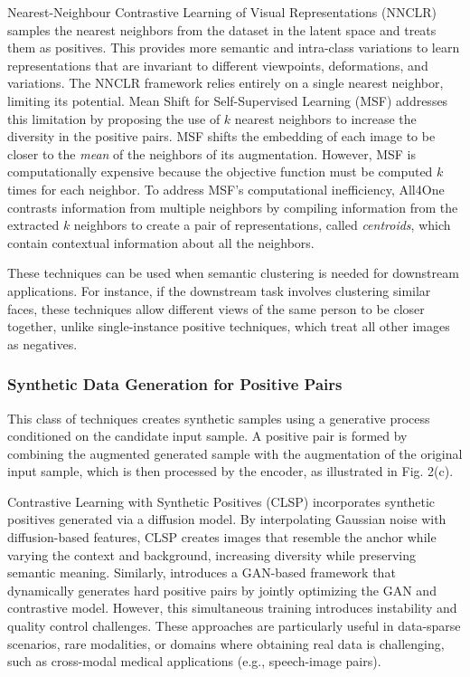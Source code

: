 Nearest-Neighbour Contrastive Learning of Visual Representations (NNCLR)\cite{dwibedi2021little} samples the nearest neighbors from the dataset in the latent space and treats them as positives. This provides
more semantic and intra-class variations to learn representations that are invariant to different viewpoints, deformations, and variations. The NNCLR framework relies entirely on a single nearest neighbor, limiting its potential. Mean Shift for Self-Supervised Learning (MSF) \cite{koohpayegani2021mean} addresses this limitation by proposing the use of \(k\) nearest neighbors to increase the diversity in the positive pairs. MSF shifts the embedding of each image to be closer to the \textit{mean} of the neighbors of its augmentation.
However, MSF is computationally expensive because the objective function must be computed \(k\) times for each neighbor. To address MSF's computational inefficiency, All4One \cite{estepa2023all4one} contrasts information from multiple neighbors by compiling information from the extracted \(k\) neighbors to create a pair of representations, called \textit{centroids}, which contain contextual information about all the neighbors. 

These techniques can be used when semantic clustering is needed for downstream applications. For instance, if the downstream task involves clustering similar faces, these techniques allow different views of the same person to be closer together, unlike single-instance positive techniques, which treat all other images as negatives.

\subsubsection{Synthetic Data Generation for Positive Pairs}

This class of techniques creates synthetic samples using a generative process conditioned on the candidate input sample. A positive pair is formed by combining the augmented generated sample with the augmentation of the original input sample, which is then processed by the encoder, as illustrated in Fig. 2(c).

Contrastive Learning with Synthetic Positives (CLSP) \cite{zeng2024contrastive} incorporates synthetic positives generated via a diffusion model. By interpolating Gaussian noise with diffusion-based features, CLSP creates images that resemble the anchor while varying the context and background, increasing diversity while preserving semantic meaning. Similarly, \cite{wu2023synthetic} introduces a GAN-based framework that dynamically generates hard positive pairs by jointly optimizing the GAN and contrastive model. However, this simultaneous training introduces instability and quality control challenges. These approaches are particularly useful in data-sparse scenarios, rare modalities, or domains where obtaining real data is challenging, such as cross-modal medical applications (e.g., speech-image pairs).



